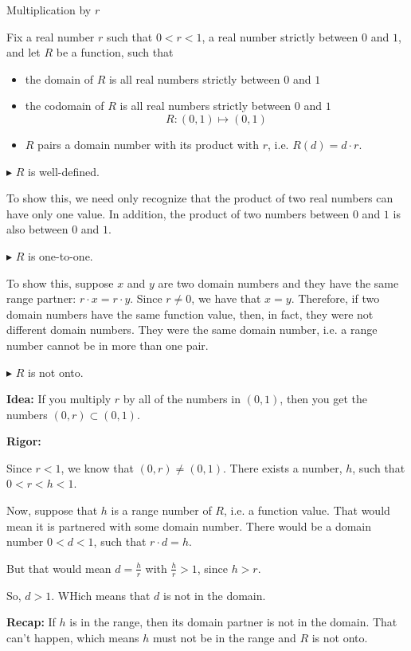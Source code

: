 \documentclass{ximera}
\begin{document}
\begin{example} Multiplication by $r$ 



Fix a real number $r$ such that $0 < r < 1$, a real number strictly between $0$ and $1$, and let $R$ be a function, such that

\begin{itemize}
\item the domain of $R$ is all real numbers strictly between $0$ and $1$  
\item the codomain of $R$ is all real numbers strictly between $0$ and $1$  
\[
R : (0,1) \mapsto (0,1)
\]
\item $R$ pairs a domain number with its product with $r$, i.e. $R(d) = d \cdot r$.
\end{itemize}





$\blacktriangleright$ $R$ is well-defined.  

To show this, we need only recognize that the product of two real numbers can have only one value.  In addition, the product of two numbers between $0$ and $1$ is also between $0$ and $1$.  


$\blacktriangleright$ $R$ is one-to-one. 

To show this, suppose $x$ and $y$ are two domain numbers and they have the same range partner: $r \cdot x = r \cdot y$.  Since $r \ne 0$, we have that $x = y$. Therefore, if two domain numbers have the same function value, then, in fact, they were not different domain numbers.  They were the same domain number, i.e. a range number cannot be in more than one pair.


$\blacktriangleright$ $R$ is not onto.

\textbf{Idea:} If you multiply $r$ by all of the numbers in $(0,1)$, then you get the numbers $(0,r) \subset (0, 1)$.

\textbf{Rigor:}

Since $r < 1$, we know that  $(0,r) \ne (0, 1)$. There exists a number, $h$, such that $0 < r < h < 1$.  

Now, suppose that $h$ is a range number of $R$, i.e. a function value. That would mean it is partnered with some domain number.  There would be a domain number $0 < d < 1$, such that  $r \cdot d = h$.  


But that would mean $d = \frac{h}{r}$ with $\frac{h}{r} > 1$, since $h > r$.  

So, $d > 1$.  WHich means that $d$ is not in the domain.

\textbf{Recap:} If $h$ is in the range, then its domain partner is not in the domain.  That can't happen, which means $h$ must not be in the range and $R$ is not onto.





\end{example} 
\end{document}
